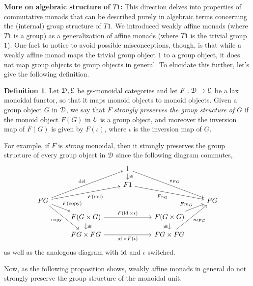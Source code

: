 \documentclass[a4paper,UKenglish,numberwithinsect,cleveref, autoref, thm-restate]{lipics-v2021}
\theoremstyle{plain} %
\theoremstyle{definition} %
\newtheorem{mydefinition}[mytheorem]{Definition}
\begin{document}
\textbf{More on algebraic structure of $T1$:}
This direction delves into properties of commutative monads that can be described purely in algebraic terms concerning the (internal) group structure of $T1$.
We introduced weakly affine monads (where $T1$ is a group) as a generalization of affine monads (where $T1$ is the trivial group $1$).
One fact to notice to avoid possible misconceptions, though, is that while a weakly affine monad maps the trivial group object $1$ to a group object, it does not map group objects to group objects in general.
To elucidate this further, let's give the following definition.

\begin{mydefinition}
 Let $\mathcal{D},\mathcal{E}$ be gs-monoidal categories and let $F:\mathcal{D}\to\mathcal{E}$ be a lax monoidal functor, so that it maps monoid objects to monoid objects.
Given a group object $G$ in $\mathcal{D}$, we say that $F$ \emph{strongly preserves the group structure of $G$} if the monoid object $F(G)$ in $\mathcal{E}$ is a group object, and moreover the inversion map of $F(G)$ is given by $F(\iota)$, where $\iota$ is the inversion map of $G$.
\end{mydefinition}

For example, if $F$ is \emph{strong} monoidal, then it strongly preserves the group structure of every group object in $\mathcal{D}$ since the following diagram commutes,
\[
 \begin{tikzcd}[row sep=small]
  & & 1 \ar{ddrr}{e_{FG}} \ar{d}{\cong}\\
  & & F1 \ar{drr}[swap]{Fe_G} \\
  FG \ar{uurr}{\mathrm{del}} \ar{urr}[swap]{F(\mathrm{del})} \ar{dr}{F(\mathrm{copy})} \ar{ddr}[swap]{\mathrm{copy}} & && & FG \\
  & F(G\times G) \ar{d}{\cong} \ar{rr}{F(\id\times\iota)} && F(G\times G) \ar{d}[swap]{\cong} \ar{ur}{Fm_G} \\
  & FG\times FG \ar{rr}[swap]{\id\times F(\iota)} && FG\times FG \ar{uur}[swap]{m_{FG}}
 \end{tikzcd}
\]
as well as the analogous diagram with $\operatorname{ id}$ and $\iota$ switched.

Now, as the following proposition shows, weakly affine monads in general do not strongly preserve the group structure of the monoidal unit.
\end{document}
